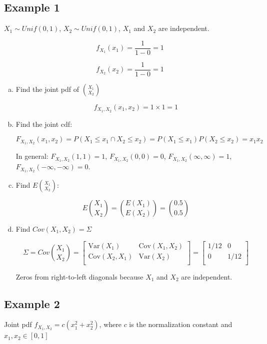 \documentclass{report}
\begin{document}
\subsection*{Example 1}

$X_1 \sim Unif(0,1)$, $X_2 \sim Unif(0,1)$, $X_1$ and $X_2$ are independent.

$$f_{X_1}(x_1) = \frac{1}{1-0} = 1$$

$$f_{X_2}(x_2) = \frac{1}{1-0} = 1$$

\begin{enumerate}[(a)]
\item Find the joint pdf of $X_1 \choose X_2$

$$f_{X_1, X_2}(x_1, x_2) = 1 \times 1 = 1$$

\item Find the joint cdf:

$$F_{X_1, X_2}(x_1, x_2) = P(X_1 \leq x_1 \cap X_2 \leq x_2) = P(X_1 \leq x_1) P(X_2 \leq x_2) = x_1 x_2$$

In general:
$F_{X_1, X_2}(1, 1) = 1$, $F_{X_1, X_2}(0,0) = 0$, $F_{X_1, X_2}(\infty, \infty) = 1$, $F_{X_1, X_2}(-\infty, -\infty) = 0$.

\item Find $E{X_1 \choose X_2}$:

$$E{X_1 \choose X_2} = {E(X_1) \choose E(X_2)} = {0.5 \choose 0.5}$$

\item Find $Cov(X_1, X_2) = \Sigma$


$$ \Sigma = Cov{X_1 \choose X_2} = 
\begin{bmatrix}
\text{Var}(X_1) & \text{Cov}(X_1, X_2) \\
\text{Cov}(X_2, X_1) & \text{Var}(X_2) \\
\end{bmatrix} =  
\begin{bmatrix}
1/12 & 0 \\
0 & 1/12 \\
\end{bmatrix}
$$ 

Zeros from right-to-left diagonals because $X_1$ and $X_2$ are independent.

\end{enumerate}

\subsection*{Example 2}

Joint pdf $f_{X_1, X_2} = c(x_1^2 + x_2^2)$, where $c$ is the normalization constant and $x_1, x_2 \in [0,1]$
\end{document}
